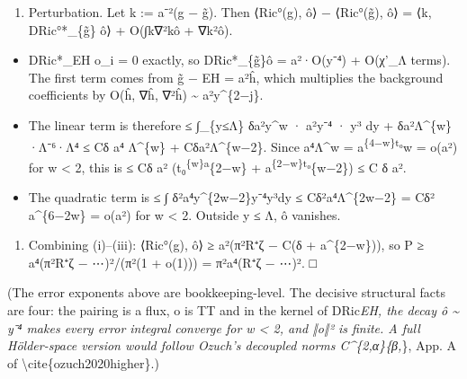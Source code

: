 \documentclass[
  10pt,
]{report}
\providecommand{\tightlist}{%
  \setlength{\itemsep}{0pt}\setlength{\parskip}{0pt}}
\begin{document}
\begin{enumerate}
\def\labelenumi{(\roman{enumi})}
\setcounter{enumi}{2}
\tightlist
\item
  Perturbation. Let k := a⁻²(g − g̃). Then ⟨Ric°(g), ô⟩ − ⟨Ric°(g̃), ô⟩ =
  ⟨k, DRic°*\_\{g̃\} ô⟩ +
  O(∫\textbar k\textbar\textbar∇²k\textbar\textbar ô\textbar{} +
  \textbar∇k\textbar²\textbar ô\textbar).
\end{enumerate}

\begin{itemize}
\tightlist
\item
  DRic*\_EH o\_i = 0 exactly, so DRic*\_\{g̃\}ô =
  a²·O(\textbar y\textbar⁻⁴) + O(χ'\_Λ terms). The first term comes from
  g̃ − EH = a²ĥ, which multiplies the background coefficients by
  O(\textbar ĥ\textbar, \textbar∇ĥ\textbar, \textbar∇²ĥ\textbar)
  \textasciitilde{} a²\textbar y\textbar\^{}\{2−j\}.
\item
  The linear term is therefore ≤ ∫\_\{\textbar y\textbar≤Λ\}
  δa²\textbar y\textbar\^{}w · a²\textbar y\textbar⁻⁴ ·
  \textbar y\textbar³ dy + δa²Λ\^{}\{w\}·Λ⁻⁶·Λ⁴ ≤ Cδ a⁴ Λ\^{}\{w\} +
  Cδa²Λ\^{}\{w−2\}. Since a⁴Λ\^{}w = a\textsuperscript{\{4−w\}t₀}w =
  o(a²) for w \textless{} 2, this is ≤ Cδ a²
  (t₀\textsuperscript{\{w\}a}\{2−w\} +
  a\textsuperscript{\{2−w\}t₀}\{w−2\}) ≤ C δ a².
\item
  The quadratic term is ≤ ∫
  δ²a⁴\textbar y\textbar\^{}\{2w−2\}\textbar y\textbar⁻⁴\textbar y\textbar³dy
  ≤ Cδ²a⁴Λ\^{}\{2w−2\} = Cδ² a\^{}\{6−2w\} = o(a²) for w \textless{} 2.
  Outside \textbar y\textbar{} ≤ Λ, ô vanishes.
\end{itemize}

\begin{enumerate}
\def\labelenumi{(\roman{enumi})}
\setcounter{enumi}{3}
\tightlist
\item
  Combining (i)--(iii): \textbar⟨Ric°(g), ô⟩\textbar{} ≥
  a²(π²\textbar R⁺ζ\textbar{} − C(δ + a\^{}\{2−w\})), so P ≥
  a⁴(π²\textbar R⁺ζ\textbar{} − ⋯)²/(π²(1 + o(1))) =
  π²a⁴(\textbar R⁺ζ\textbar{} − ⋯)². □
\end{enumerate}

(The error exponents above are bookkeeping-level. The decisive
structural facts are four: the pairing is a flux, o is TT and in the
kernel of DRic\emph{\emph{EH, the decay ô \textasciitilde{}
\textbar y\textbar⁻⁴ makes every error integral converge for w
\textless{} 2, and ‖o‖² is finite. A full Hölder-space version would
follow Ozuch's decoupled norms C\^{}\{2,α\}}\{β,}\}, App. A of
\textbackslash cite\{ozuch2020higher\}.)
\end{document}
